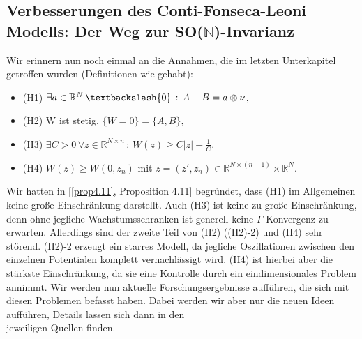 \subsection[Verbesserungen des Conti-Fonseca-Leoni Modells: Der Weg zur SO(N)-Invarianz]{Verbesserungen des Conti-Fonseca-Leoni Modells: Der Weg zur SO(\(\mathbb{N}\))-Invarianz}{\label{subsec:soninva}}
Wir erinnern nun noch einmal an die Annahmen, die im letzten Unterkapitel getroffen wurden (Definitionen wie gehabt):
\begin{itemize}
    \item (H1) \(\exists a \in \mathbb{R}^N \, \textbackslash \{0\} \, : \, A -                 B = a \otimes \nu\),
    \item (H2) W ist stetig, \(\{W = 0\} = \{A,B\}\),
    \item (H3) \(\exists C > 0 \, \forall z \in \mathbb{R}^{N \times n} \, : \,                 W(z) \geq C |z| - \frac{1}{C}\).
    \item (H4) \(W(z) \geq W(0,z_n)\) mit \(z = (z',z_n) \in \mathbb{R}^{N                      \times (n-1)} \times \mathbb{R}^N\).
\end{itemize}
Wir hatten in [\ref{prop4.11}, Proposition 4.11] begründet, dass (H1) im Allgemeinen keine große Einschränkung darstellt. Auch (H3) ist keine zu große Einschränkung, denn ohne jegliche Wachstumsschranken ist generell keine \(\Gamma\)-Konvergenz zu erwarten. Allerdings sind der zweite Teil von (H2) ((H2)-2) und (H4) sehr störend. (H2)-2 erzeugt ein starres Modell, da jegliche Oszillationen zwischen den einzelnen Potentialen komplett vernachlässigt wird. (H4) ist hierbei aber die stärkste Einschränkung, da sie eine Kontrolle durch ein eindimensionales Problem annimmt. Wir werden nun aktuelle Forschungsergebnisse aufführen, die sich mit diesen Problemen befasst haben. Dabei werden wir aber nur die neuen Ideen aufführen, Details lassen sich dann in den \\jeweiligen Quellen finden.

